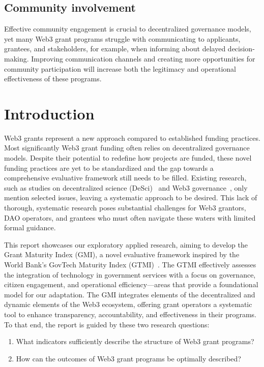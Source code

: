 \documentclass[a4,10pt]{article}
\begin{document}
\subsection*{Community involvement}\label{sec_1.3}
Effective community engagement is crucial to decentralized governance models, yet many Web3 grant programs struggle with communicating to applicants, grantees, and stakeholders, for example, when informing about delayed decision-making. Improving communication channels and creating more opportunities for community participation will increase both the legitimacy and operational effectiveness of these programs.

\section{Introduction}\label{sec_2}
Web3 grants represent a new approach compared to established funding practices. Most significantly Web3 grant funding often relies on decentralized governance models. Despite their potential to redefine how projects are funded, these novel funding practices are yet to be standardized and the gap towards a comprehensive evaluative framework still needs to be filled. Existing research, such as studies on decentralized science (DeSci)~\cite{1} and Web3 governance~\cite{2}, only mention selected issues, leaving a systematic approach to be desired. This lack of thorough, systematic research poses substantial challenges for Web3 grantors, DAO operators, and grantees who must often navigate these waters with limited formal guidance.

This report showcases our exploratory applied research, aiming to develop the Grant Maturity Index (GMI), a novel evaluative framework inspired by the World Bank’s GovTech Maturity Index (GTMI)~\cite{3}. The GTMI effectively assesses the integration of technology in government services with a focus on governance, citizen engagement, and operational efficiency—areas that provide a foundational model for our adaptation. The GMI integrates elements of the decentralized and dynamic elements of the Web3 ecosystem, offering grant operators a systematic tool to enhance transparency, accountability, and effectiveness in their programs. To that end, the report is guided by these two research questions:

\begin{enumerate}
    \item What indicators sufficiently describe the structure of Web3 grant programs?
    \item How can the outcomes of Web3 grant programs be optimally described?
\end{enumerate}
\end{document}
